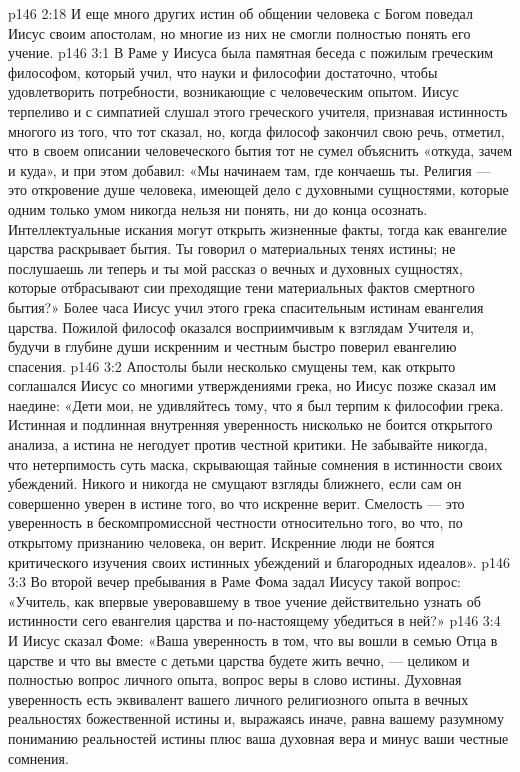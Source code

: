 \vs p146 2:18 \pc И еще много других истин об общении человека с Богом поведал Иисус своим апостолам, но многие из них не смогли полностью понять его учение.
\vs p146 3:1 В Раме у Иисуса была памятная беседа с пожилым греческим философом, который учил, что науки и философии достаточно, чтобы удовлетворить потребности, возникающие с человеческим опытом. Иисус терпеливо и с симпатией слушал этого греческого учителя, признавая истинность многого из того, что тот сказал, но, когда философ закончил свою речь, отметил, что в своем описании человеческого бытия тот не сумел объяснить «откуда, зачем и куда», и при этом добавил: «Мы начинаем там, где кончаешь ты. Религия --- это откровение душе человека, имеющей дело с духовными сущностями, которые одним только умом никогда нельзя ни понять, ни до конца осознать. Интеллектуальные искания могут открыть жизненные факты, тогда как евангелие царства раскрывает  бытия. Ты говорил о материальных тенях истины; не послушаешь ли теперь и ты мой рассказ о вечных и духовных сущностях, которые отбрасывают сии преходящие тени материальных фактов смертного бытия?» Более часа Иисус учил этого грека спасительным истинам евангелия царства. Пожилой философ оказался восприимчивым к взглядам Учителя и, будучи в глубине души искренним и честным быстро поверил евангелию спасения.
\vs p146 3:2 Апостолы были несколько смущены тем, как открыто соглашался Иисус со многими утверждениями грека, но Иисус позже сказал им наедине: «Дети мои, не удивляйтесь тому, что я был терпим к философии грека. Истинная и подлинная внутренняя уверенность нисколько не боится открытого анализа, а истина не негодует против честной критики. Не забывайте никогда, что нетерпимость суть маска, скрывающая тайные сомнения в истинности своих убеждений. Никого и никогда не смущают взгляды ближнего, если сам он совершенно уверен в истине того, во что искренне верит. Смелость --- это уверенность в бескомпромиссной честности относительно того, во что, по открытому признанию человека, он верит. Искренние люди не боятся критического изучения своих истинных убеждений и благородных идеалов».
\vs p146 3:3 \pc Во второй вечер пребывания в Раме Фома задал Иисусу такой вопрос: «Учитель, как впервые уверовавшему в твое учение действительно узнать об истинности сего евангелия царства и по\hyp{}настоящему убедиться в ней?»
\vs p146 3:4 И Иисус сказал Фоме: «Ваша уверенность в том, что вы вошли в семью Отца в царстве и что вы вместе с детьми царства будете жить вечно, --- целиком и полностью вопрос личного опыта, вопрос веры в слово истины. Духовная уверенность есть эквивалент вашего личного религиозного опыта в вечных реальностях божественной истины и, выражаясь иначе, равна вашему разумному пониманию реальностей истины плюс ваша духовная вера и минус ваши честные сомнения.
